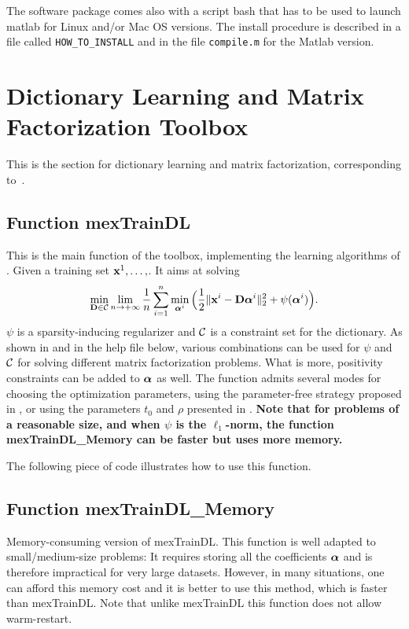 \documentclass[a4paper, 11pt]{article}
\begin{document}
The software package comes also with a script bash that has to be used to
launch matlab for Linux and/or Mac OS versions.  The install procedure is
described in a file called \verb|HOW_TO_INSTALL| and in the file
\verb|compile.m| for the Matlab version.

\section{Dictionary Learning and Matrix Factorization Toolbox}
This is the section for dictionary learning and matrix factorization, corresponding to~\cite{mairal7,mairal9}.

\subsection{Function mexTrainDL}
This is the main function of the toolbox, implementing the learning algorithms of \cite{mairal9}.
Given a training set ${\mathbf x}^1,\ldots,  $. It aims at solving
\begin{equation}
\min_{{\mathbf D} \in {\mathcal C}} \lim_{n \to +\infty} \frac{1}{n} \sum_{i=1}^n \min_{{\boldsymbol\alpha}^i} \Big( \frac{1}{2} \|{\mathbf x}^i-{\mathbf D}{\boldsymbol\alpha}^i\|_2^2 + \psi({\boldsymbol\alpha}^i)\Big).
\end{equation}
$\psi$ is a sparsity-inducing regularizer and ${\mathcal C}$ is a constraint set for the dictionary. As shown in \cite{mairal9}
and in the help file below, various combinations can be used for $\psi$ and ${\mathcal C}$ for solving different matrix factorization problems.
What is more, positivity constraints can be added to ${\boldsymbol\alpha}$ as well. The function admits several modes for choosing the optimization parameters, using the parameter-free strategy proposed in \cite{mairal7}, or using the parameters $t_0$ and $\rho$ presented
in \cite{mairal9}. {\bf Note that for problems of a reasonable size, and when $\psi$ is the $\ell_1$-norm,
   the function mexTrainDL\_Memory can be faster but uses more memory.}



The following piece of code illustrates how to use this function.



\subsection{Function mexTrainDL\_Memory}
Memory-consuming version of mexTrainDL. This function is well adapted to small/medium-size problems:
It requires storing all the coefficients ${\boldsymbol\alpha}$ and is therefore impractical
for very large datasets. However, in many situations, one can afford this memory cost and it is better to use this method, which
is faster than mexTrainDL.
Note that unlike mexTrainDL this function does not allow warm-restart.
\end{document}
